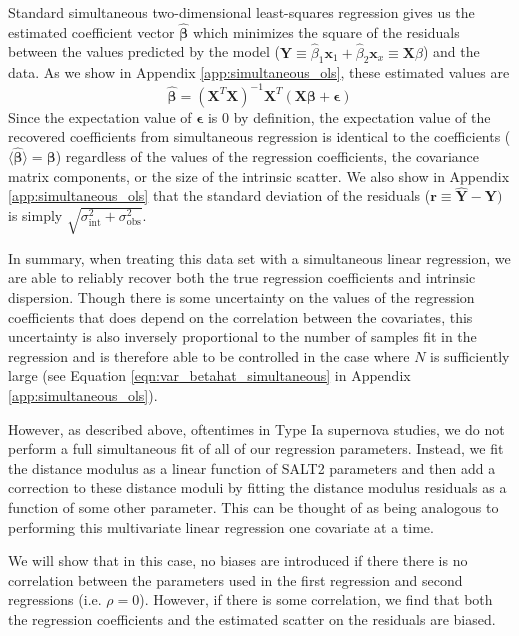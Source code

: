 Standard simultaneous two-dimensional least-squares regression gives us the estimated coefficient vector $\bm{\hat{\beta}}$ which minimizes the square of the residuals between the values predicted by the model ($\bm{\hat{Y}} \equiv \hat{\beta}_1\bm{x}_1 + \hat{\beta}_2\bm{x}_x \equiv \bm{X}\hat{\beta}$) and the data. As we show in Appendix \ref{app:simultaneous_ols}, these estimated values are
\begin{equation}
    \bm{\hat{\beta}} = (\bm{X}^T\bm{X})^{-1}\bm{X}^T(\bm{X\beta} + \bm{\epsilon})
    \label{eqn:sim_beta_vec}
\end{equation}
Since the expectation value of $\bm{\epsilon}$ is 0 by definition, the expectation value of the recovered coefficients from simultaneous regression is identical to the coefficients ($\langle\bm{\hat{\beta}}\rangle=\bm{\beta}$) regardless of the values of the regression coefficients, the covariance matrix components, or the size of the intrinsic scatter. We also show in Appendix \ref{app:simultaneous_ols} that the standard deviation of the residuals ($\bm{r}\equiv\bm{\hat{Y}}-\bm{Y})$ is simply $\sqrt{\sigma_\text{int}^2 + \sigma_\text{obs}^2}$.

In summary, when treating this data set with a simultaneous linear regression, we are able to reliably recover both the true regression coefficients and intrinsic dispersion. Though there is some uncertainty on the values of the regression coefficients that does depend on the correlation between the covariates, this uncertainty is also inversely proportional to the number of samples fit in the regression and is therefore able to be controlled in the case where $N$ is sufficiently large (see Equation \ref{eqn:var_betahat_simultaneous} in Appendix \ref{app:simultaneous_ols}).

However, as described above, oftentimes in Type Ia supernova studies, we do not perform a full simultaneous fit of all of our regression parameters. Instead, we fit the distance modulus as a linear function of SALT2 parameters and then add a correction to these distance moduli by fitting the distance modulus residuals as a function of some other parameter. This can be thought of as being analogous to performing this multivariate linear regression one covariate at a time.

We will show that in this case, no biases are introduced if there there is no correlation between the parameters used in the first regression and second regressions (i.e. $\rho=0$). However, if there is some correlation, we find that both the regression coefficients and the estimated scatter on the residuals are biased.

